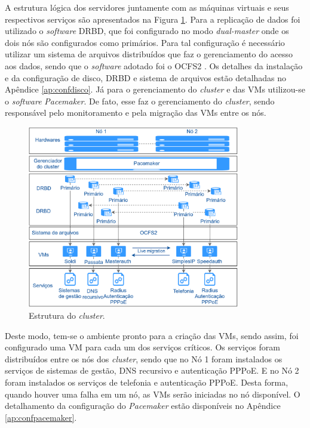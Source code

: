 A estrutura lógica dos servidores juntamente com as máquinas virtuais e seus respectivos serviços são apresentados na Figura 
\ref{fig:projeto_estrutura}. Para a replicação de dados foi utilizado o \textit{software} \ac{DRBD}, que foi configurado no modo 
\textit{dual-master} onde os dois nós são configurados como primários. Para tal configuração é necessário utilizar um sistema de arquivos 
distribuídos que faz o gerenciamento do acesso aos dados, sendo que o \textit{software} adotado foi o \ac{OCFS2} \cite{ocfs2}. 
Os detalhes da instalação e da configuração de disco, \ac{DRBD} e sistema de arquivos estão detalhadas no Apêndice \ref{ap:confdisco}. 
Já para o gerenciamento do \textit{cluster} e das \acp{VM} utilizou-se o \textit{software} \textit{Pacemaker}. De fato, esse faz o gerenciamento do
\textit{cluster}, sendo responsável pelo monitoramento e pela migração das \acp{VM} entre os nós.

\begin{figure}[h!]
 \centering
 \includegraphics[width=350px]{img/projeto_estrutura.eps}
 \caption{Estrutura do \textit{cluster}.}
 \label{fig:projeto_estrutura}
\end{figure}


Deste modo, tem-se o ambiente pronto para a criação das \acp{VM}, sendo assim, foi configurado uma \ac{VM} para cada um dos serviços críticos.
Os serviços foram distribuídos entre os nós dos \textit{cluster}, sendo que no Nó 1 foram instalados os serviços de sistemas de gestão, 
\ac{DNS} recursivo e autenticação \ac{PPPoE}. E no Nó 2 foram instalados os serviços de telefonia e autenticação \ac{PPPoE}.
Desta forma, quando houver uma falha em um nó, as \acp{VM} serão iniciadas no nó disponível. O detalhamento da configuração do \textit{Pacemaker} 
estão disponíveis no Apêndice \ref{ap:confpacemaker}.



